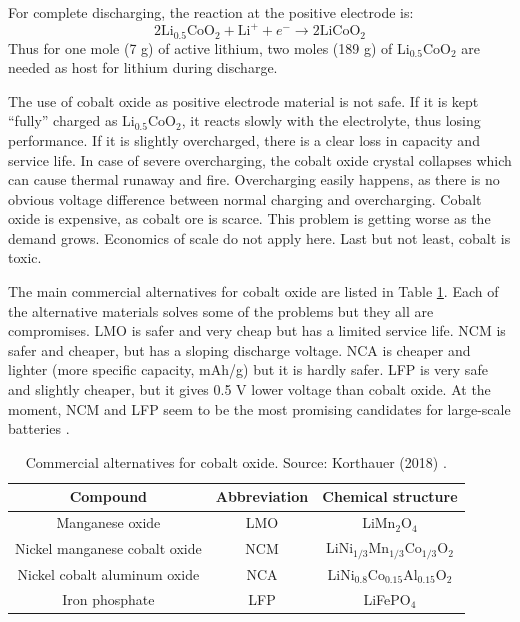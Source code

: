 For complete discharging, the reaction at the positive electrode is:
\begin{equation}
    \label{eq:positive-electrode}
    2\text{Li}_{0.5}\text{CoO}_2 + \text{Li}^+ + e^- \rightarrow 2\text{LiCoO}_2
\end{equation}
Thus for one mole (7 g) of active lithium, two moles (189 g) of Li$_{0.5}$CoO$_2$ are needed as host for lithium during discharge.

The use of cobalt oxide as positive electrode material is not safe. If it is kept “fully” charged as Li$_{0.5}$CoO$_2$, it reacts slowly with the electrolyte, thus losing performance. If it is slightly overcharged, there is a clear loss in capacity and service life. In case of severe overcharging, the cobalt oxide crystal collapses which can cause thermal runaway and fire. Overcharging easily happens, as there is no obvious voltage difference between normal charging and overcharging. Cobalt oxide is expensive, as cobalt ore is scarce. This problem is getting worse as the demand grows. Economics of scale do not apply here. Last but not least, cobalt is toxic.

The main commercial alternatives for cobalt oxide are listed in Table \ref{table:cathode-alternatives}. Each of the alternative materials solves some of the problems but they all are compromises. LMO is safer and very cheap but has a limited service life. NCM is safer and cheaper, but has a sloping discharge voltage. NCA is cheaper and lighter (more specific capacity, mAh/g) but it is hardly safer. LFP is very safe and slightly cheaper, but it gives 0.5 V lower voltage than cobalt oxide. At the moment, NCM and LFP seem to be the most promising candidates for large-scale batteries \cite{manthiram2020reflection,mekonnen2016review}.

\begin{table}[H]
    \centering 
        \begin{tabular}{|c c c|}
        \hline
        \rowcolor{bluepoli!40}
        \textbf{Compound} & \textbf{Abbreviation} & \textbf{Chemical structure} \T\B \\
        \hline \hline
        Manganese oxide & LMO & LiMn$_2$O$_4$\T\B\\
        \hline
        Nickel manganese cobalt oxide & NCM & LiNi$_{1/3}$Mn$_{1/3}$Co$_{1/3}$O$_2$\T\B\\
        \hline
        Nickel cobalt aluminum oxide & NCA & LiNi$_{0.8}$Co$_{0.15}$Al$_{0.15}$O$_2$\T\B\\
        \hline
        Iron phosphate & LFP & LiFePO$_4$\T\B\\
        \hline
        \end{tabular}
        \\[10pt]
        \caption[Commercial alternatives for cobalt oxide]{Commercial alternatives for cobalt oxide. Source: Korthauer (2018) \cite{korthauer2018lithium}.}
        \label{table:cathode-alternatives}
\end{table}

